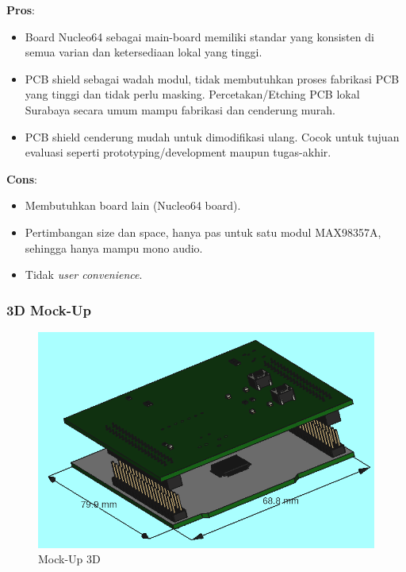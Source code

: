 \documentclass[12pt,]{article}
\begin{document}
	\textbf{Pros}:
	\begin{itemize}
		\item Board Nucleo64 sebagai main-board memiliki standar yang konsisten di semua varian dan ketersediaan lokal yang tinggi.
		
		\item PCB shield sebagai wadah modul, tidak membutuhkan proses fabrikasi PCB yang tinggi dan tidak perlu masking.
		Percetakan/Etching PCB lokal Surabaya secara umum mampu fabrikasi dan cenderung murah.
		
		\item PCB shield cenderung mudah untuk dimodifikasi ulang.
		Cocok untuk tujuan evaluasi seperti prototyping/development maupun tugas-akhir.
	\end{itemize}

	\textbf{Cons}:
	\begin{itemize}
		\item Membutuhkan board lain (Nucleo64 board).
		\item Pertimbangan size dan space, hanya pas untuk satu modul MAX98357A, sehingga hanya mampu mono audio.
		\item Tidak \textit{user convenience}. 
	\end{itemize}

	\subsubsection{3D Mock-Up}
	\begin{figure}[!ht]
		\centering
		\includegraphics[width=400pt]{images/test1}
		\caption{Mock-Up 3D}
	\end{figure}

\end{document}
